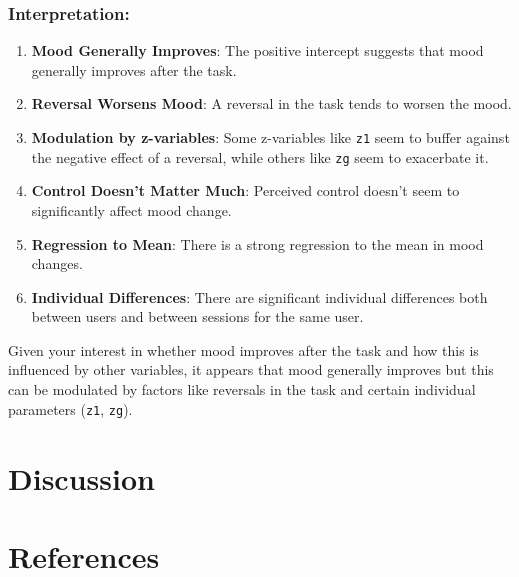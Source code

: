 \documentclass[
  man]{apa6}
\begin{document}
\hypertarget{interpretation}{%
\subsubsection{Interpretation:}\label{interpretation}}

\begin{enumerate}
\def\labelenumi{\arabic{enumi}.}
\item
  \textbf{Mood Generally Improves}: The positive intercept suggests that mood generally improves after the task.
\item
  \textbf{Reversal Worsens Mood}: A reversal in the task tends to worsen the mood.
\item
  \textbf{Modulation by z-variables}: Some z-variables like \texttt{z1} seem to buffer against the negative effect of a reversal, while others like \texttt{zg} seem to exacerbate it.
\item
  \textbf{Control Doesn't Matter Much}: Perceived control doesn't seem to significantly affect mood change.
\item
  \textbf{Regression to Mean}: There is a strong regression to the mean in mood changes.
\item
  \textbf{Individual Differences}: There are significant individual differences both between users and between sessions for the same user.
\end{enumerate}

Given your interest in whether mood improves after the task and how this is influenced by other variables, it appears that mood generally improves but this can be modulated by factors like reversals in the task and certain individual parameters (\texttt{z1}, \texttt{zg}).

\hypertarget{discussion}{%
\section{Discussion}\label{discussion}}

\newpage

\hypertarget{references}{%
\section{References}\label{references}}
\end{document}
